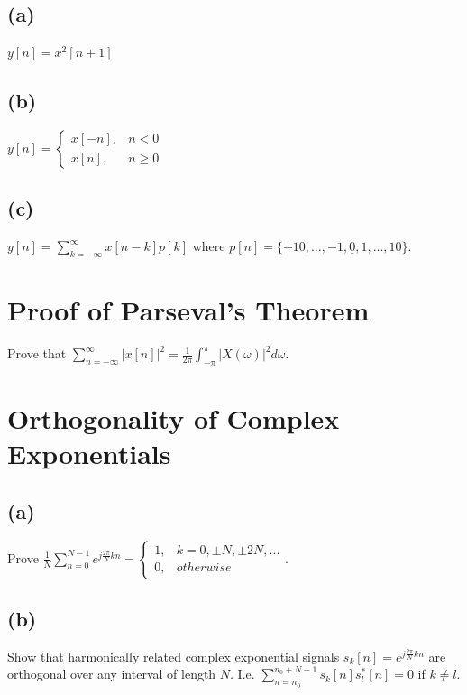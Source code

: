 \documentclass[11pt]{article}
\begin{document}
\subsection*{(a)}

$y[n] = x^2[n+1]$

\subsection*{(b)}

$y[n]=\begin{cases}x[-n], & n < 0\\ x[n], & n \geq 0 \end{cases} $

\subsection*{(c)}

$y[n] = \sum_{k=-\infty}^{\infty}x[n-k]p[k]$ where $p[n] = \{-10,\ldots,-1,\underline{0},1,\ldots,10\}$.


\section{Proof of Parseval's Theorem}
Prove that $\sum_{n=-\infty}^\infty|x[n]|^2 = \frac{1}{2 \pi} \int_{- \pi}^\pi |X(\omega)|^2 d\omega$.

\section{Orthogonality of Complex Exponentials}

\subsection*{(a)}
Prove $\frac{1}{N}\sum\limits_{n=0}^{N-1} e^{j\frac{2 \pi}{N} k n} = \begin{cases}1, & k =0, \pm N, \pm 2N,... \\0, & otherwise \end{cases}$.

\subsection*{(b)} 
Show that harmonically related complex exponential signals $s_k[n]=e^{j\frac{2 \pi}{N} kn}$ are orthogonal over any interval of length $N$. I.e. $\sum\limits_{n=n_0}^{n_0+N-1} s_k[n]s_l^*[n] = 0$ if $k \neq l$.
\end{document}
